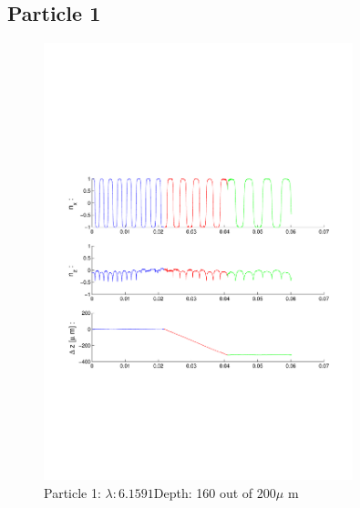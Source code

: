 \subsection{Particle 1}

\begin{figure}[H]
\centering
\includegraphics[width=0.8\textwidth]{Images/Particle 1/Particle1.pdf}
\caption{Particle 1: $ \lambda: 6.1591$Depth: 160 out of $200 \mu $ m}
\end{figure}

